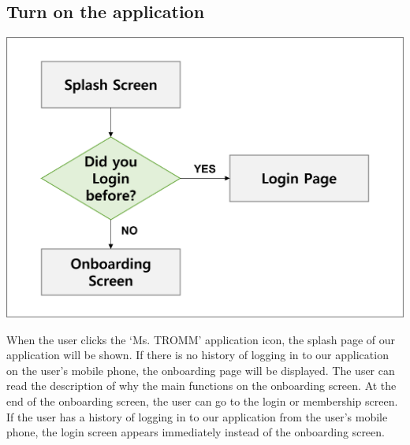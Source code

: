 \documentclass[conference]{IEEEtran}
\begin{document}
\break

\subsection{Turn on the application}
\centerline{\includegraphics[scale=0.5]{assets/flow_1.png}}
When the user clicks the ‘Ms. TROMM’ application icon, the splash page of our application will be shown. If there is no history of logging in to our application on the user's mobile phone, the onboarding page will be displayed. The user can read the description of why the main functions on the onboarding screen. At the end of the onboarding screen, the user can go to the login or membership screen. If the user has a history of logging in to our application from the user's mobile phone, the login screen appears immediately instead of the onboarding screen.\\ \\
\end{document}
